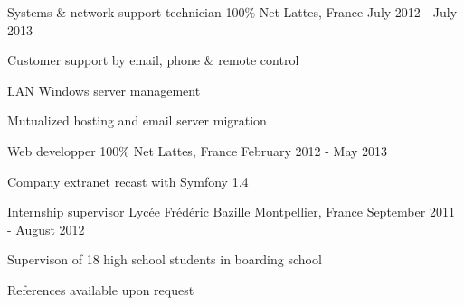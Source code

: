 \begin{cventries}
  \cventry
    {Systems \& network support technician} %
    {100\% Net} %
    {Lattes, France} %
    {July 2012 - July 2013} %
    {
      \begin{cvitems} %
        \item {Customer support by email, phone \& remote control}
        \item {LAN Windows server management}
        \item {Mutualized hosting and email server migration}
      \end{cvitems}
    }

  \cventry
    {Web developper} %
    {100\% Net} %
    {Lattes, France} %
    {February 2012 - May 2013} %
    {
      \begin{cvitems} %
        \item {Company extranet recast with Symfony 1.4}
      \end{cvitems}
    }
  
  \cventry
    {Internship supervisor} %
    {Lycée Frédéric Bazille} %
    {Montpellier, France} %
    {September 2011 - August 2012} %
    {
      \begin{cvitems} %
        \item {Supervison of 18 high school students in boarding school}
      \end{cvitems}
    }
  
  \cventry
    {} %
    {} %
    {} %
    {} %
    {References available upon request}
  
  \end{cventries}